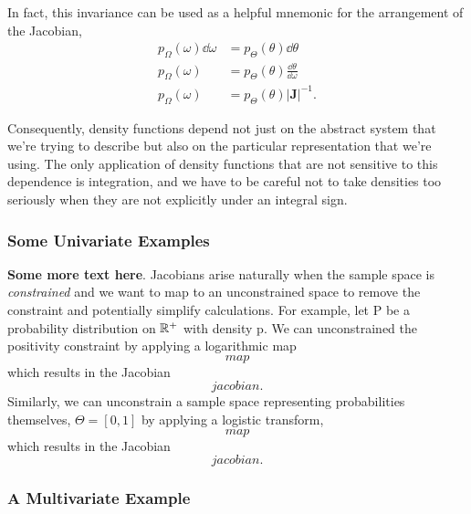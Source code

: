 In fact, this invariance can be used as a helpful mnemonic for the 
arrangement of the Jacobian,
%
\begin{align*}
p_{\Omega} \! \left( \omega \right) \dd \omega
&=
p_{\Theta} \! \left( \theta \right) \dd \theta
\\
p_{\Omega} \! \left( \omega \right)
&= 
p_{\Theta} \! \left( \theta \right) \frac{ \dd \theta }{ \dd \omega }
\\
p_{\Omega} \! \left( \omega \right)
&= 
p_{\Theta} \! \left( \theta \right) \left| \mathbf{J} \right|^{-1}.
\end{align*}

Consequently, density functions depend not just on the abstract
system that we're trying to describe but also on the particular 
representation that we're using.  The only application of density
functions that are not sensitive to this dependence is integration,
and we have to be careful not to take densities too seriously when
they are not explicitly under an integral sign.

\subsubsection{Some Univariate Examples}

\textbf{Some more text here}.
Jacobians arise naturally when the sample space is \emph{constrained}
and we want to map to an unconstrained space to remove the constraint
and potentially simplify calculations.  For example, let P be a probability
distribution on $\mathbb{R}^{+}$ with density p.  We can unconstrained the
positivity constraint by applying a logarithmic map
%
\begin{equation*}
map
\end{equation*}
%
which results in the Jacobian
%
\begin{equation*}
jacobian.
\end{equation*}
%
Similarly, we can unconstrain a sample space representing probabilities
themselves, $\Theta = \left[0, 1 \right]$ by applying a logistic transform,
%
\begin{equation*}
map
\end{equation*}
%
which results in the Jacobian
%
\begin{equation*}
jacobian.
\end{equation*}

\subsubsection{A Multivariate Example}

